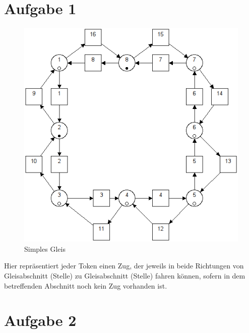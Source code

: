 \documentclass[10pt]{scrartcl}
\author{André Harms, Oliver Steenbuck}
\title{\titletext}
\date{04.04.2012}
\begin{document}
\maketitle

\setcounter{tocdepth}{3}
\tableofcontents

	\listoffigures  
	\lstlistoflistings	

\section{Aufgabe 1}
	\begin{figure}[H]
        \includegraphics[width=\textwidth]{aufgabe1.png}
        \caption{Simples Gleis}
        \label{img:aufg1}
	\end{figure}
	
	Hier repräsentiert jeder Token einen Zug, der jeweils in beide Richtungen von Gleisabschnitt (Stelle) zu Gleisabschnitt (Stelle) fahren können, sofern in dem betreffenden Abschnitt noch kein Zug vorhanden ist.
	
\section{Aufgabe 2}
\end{document}

